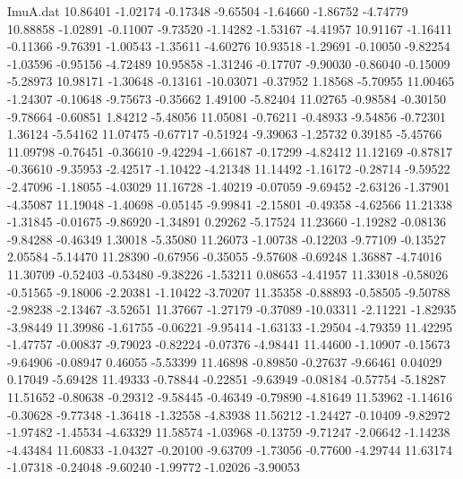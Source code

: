\begin{filecontents}{ImuA.dat}
  10.86401   -1.02174   -0.17348   -9.65504   -1.64660   -1.86752   -4.74779
  10.88858   -1.02891   -0.11007   -9.73520   -1.14282   -1.53167   -4.41957
  10.91167   -1.16411   -0.11366   -9.76391   -1.00543   -1.35611   -4.60276
  10.93518   -1.29691   -0.10050   -9.82254   -1.03596   -0.95156   -4.72489
  10.95858   -1.31246   -0.17707   -9.90030   -0.86040   -0.15009   -5.28973
  10.98171   -1.30648   -0.13161  -10.03071   -0.37952    1.18568   -5.70955
  11.00465   -1.24307   -0.10648   -9.75673   -0.35662    1.49100   -5.82404
  11.02765   -0.98584   -0.30150   -9.78664   -0.60851    1.84212   -5.48056
  11.05081   -0.76211   -0.48933   -9.54856   -0.72301    1.36124   -5.54162
  11.07475   -0.67717   -0.51924   -9.39063   -1.25732    0.39185   -5.45766
  11.09798   -0.76451   -0.36610   -9.42294   -1.66187   -0.17299   -4.82412
  11.12169   -0.87817   -0.36610   -9.35953   -2.42517   -1.10422   -4.21348
  11.14492   -1.16172   -0.28714   -9.59522   -2.47096   -1.18055   -4.03029
  11.16728   -1.40219   -0.07059   -9.69452   -2.63126   -1.37901   -4.35087
  11.19048   -1.40698   -0.05145   -9.99841   -2.15801   -0.49358   -4.62566
  11.21338   -1.31845   -0.01675   -9.86920   -1.34891    0.29262   -5.17524
  11.23660   -1.19282   -0.08136   -9.84288   -0.46349    1.30018   -5.35080
  11.26073   -1.00738   -0.12203   -9.77109   -0.13527    2.05584   -5.14470
  11.28390   -0.67956   -0.35055   -9.57608   -0.69248    1.36887   -4.74016
  11.30709   -0.52403   -0.53480   -9.38226   -1.53211    0.08653   -4.41957
  11.33018   -0.58026   -0.51565   -9.18006   -2.20381   -1.10422   -3.70207
  11.35358   -0.88893   -0.58505   -9.50788   -2.98238   -2.13467   -3.52651
  11.37667   -1.27179   -0.37089  -10.03311   -2.11221   -1.82935   -3.98449
  11.39986   -1.61755   -0.06221   -9.95414   -1.63133   -1.29504   -4.79359
  11.42295   -1.47757   -0.00837   -9.79023   -0.82224   -0.07376   -4.98441
  11.44600   -1.10907   -0.15673   -9.64906   -0.08947    0.46055   -5.53399
  11.46898   -0.89850   -0.27637   -9.66461    0.04029    0.17049   -5.69428
  11.49333   -0.78844   -0.22851   -9.63949   -0.08184   -0.57754   -5.18287
  11.51652   -0.80638   -0.29312   -9.58445   -0.46349   -0.79890   -4.81649
  11.53962   -1.14616   -0.30628   -9.77348   -1.36418   -1.32558   -4.83938
  11.56212   -1.24427   -0.10409   -9.82972   -1.97482   -1.45534   -4.63329
  11.58574   -1.03968   -0.13759   -9.71247   -2.06642   -1.14238   -4.43484
  11.60833   -1.04327   -0.20100   -9.63709   -1.73056   -0.77600   -4.29744
  11.63174   -1.07318   -0.24048   -9.60240   -1.99772   -1.02026   -3.90053

\end{filecontents}
